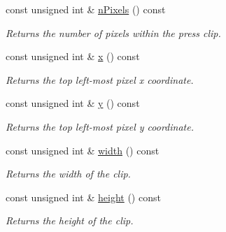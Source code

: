 \begin{CompactItemize}
const unsigned int \& \hyperlink{class_clip_9acfff7074239516465bcca11586c48d}{nPixels} () const 
\begin{CompactList}\small\item\em Returns the number of pixels within the press clip. \item\end{CompactList}\item 
const unsigned int \& \hyperlink{class_clip_fcedad938315faff5d577670f9219c61}{x} () const 
\begin{CompactList}\small\item\em Returns the top left-most pixel x coordinate. \item\end{CompactList}\item 
const unsigned int \& \hyperlink{class_clip_e06a2ad12ef2144a9d7d970b574c9c14}{y} () const 
\begin{CompactList}\small\item\em Returns the top left-most pixel y coordinate. \item\end{CompactList}\item 
const unsigned int \& \hyperlink{class_clip_88d1a47c0ec077e8c6680785509389b0}{width} () const 
\begin{CompactList}\small\item\em Returns the width of the clip. \item\end{CompactList}\item 
const unsigned int \& \hyperlink{class_clip_939908a8dde602d25335792cc0fd5d97}{height} () const 
\begin{CompactList}\small\item\em Returns the height of the clip. \item\end{CompactList}\end{CompactItemize}
